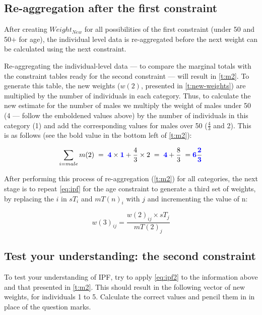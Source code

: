 \documentclass[a4paper, 11pt, twoside]{article}
\begin{document}
\subsection{Re-aggregation after the first constraint}
After creating $Weight_{New}$ for all possibilities of the first constraint (under 50 and 50$+$ for age),
the individual level data is re-aggregated before the next weight can be calculated using the next constraint.

Re-aggregating the individual-level data --- to compare the marginal totals with the constraint tables
ready for the second constraint --- will result in
\cref{t:m2}. To generate this table, the new weights ($w(2)$,
presented in \cref{t:new-weights}) are multiplied by the 
number of individuals in each category. Thus, to calculate the new
estimate for the number of males we multiply the weight of
males under 50 (4 --- follow the emboldened values above) by the
number of individuals in this category (1) and add the corresponding values
for males over 50 ($\frac{4}{3}$ and 2). This is as follows
(see the bold value in the bottom left of \cref{t:m2}):

\begin{equation}
\sum_{i = male} m(2) \; = \; \textbf{\color{blue} 4} \times \textbf{\color{blue}1} + \frac{4}{3} \times 2 \; =  \;
\textbf{\color{blue}4} + \frac{8}{3} \; = \textbf{\color{blue}6} \frac{\textbf{\color{blue}2}}{\textbf{\color{blue}3}}
\end{equation}

After performing this process of re-aggregation (\cref{t:m2}) for all categories,
the next stage is to repeat \cref{eq:ipf} for the age constraint to generate a
third set of weights, by replacing
the $i$ in $sT_{i}$ and $mT(n)_{i}$ with $j$ and incrementing the value of n:

\begin{equation}
w(3)_{ij} = \frac{w(2)_{ij} \times sT_{j}}{mT(2)_{j}}
\label{eq:ipf2}
\end{equation}

\subsection{Test your understanding: the second constraint}
To test your understanding of IPF, try to apply \cref{eq:ipf2} to the
information above
and that presented in \cref{t:m2}.
This should result in the following vector of new weights, for individuals 1 to
5. Calculate the correct values and pencil them in in place of the question
marks.  %
\end{document}
